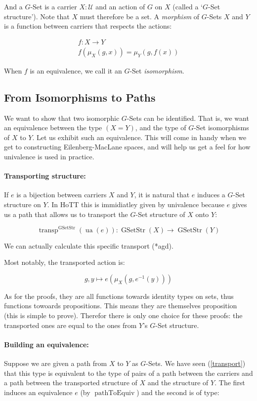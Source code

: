 \documentclass{article}
\DeclareMathOperator{\ua}{ua}
\DeclareMathOperator{\transp}{transp}
\DeclareMathOperator{\gsetstr}{GSetStr}
\DeclareMathOperator{\pathtoequiv}{pathToEquiv}
\begin{document}
And a $G$-Set is a carrier $X : \mathcal{U}$ and an action of $G$ on $X$ (called a `$G$-Set structure'). Note that $X$ must therefore be a set. A \emph{morphism} of $G$-Sets $X$ and $Y$ is a function between carriers that respects the actions:

\begin{gather*}
f : X \to Y \\
f(\mu_{X}(g,x)) = \mu_{Y}(g,f(x))
\end{gather*}

When $f$ is an equivalence, we call it an $G$-Set \emph{isomorphism}.

\subsection{From Isomorphisms to Paths} \label{iso}

We want to show that two isomorphic $G$-Sets can be identified. That is, we want an equivalence between the type $(X = Y)$, and the type of $G$-Set isomorphisms of $X$ to $Y$. Let us exhibit such an equivalence. This will come in handy when we get to constructing Eilenberg-MacLane spaces, and will help us get a feel for how univalence is used in practice.

\paragraph{Transporting structure:}

If $e$ is a bijection between carriers $X$ and $Y$, it is natural that $e$ induces a $G$-Set structure on $Y$. In HoTT this is immidiatley given by univalence because $e$ gives us a path that allows us to transport the $G$-Set structure of $X$ onto $Y$:

\[\transp^{\gsetstr}(\ua(e)) : \gsetstr(X) \to \gsetstr(Y)\]

We can actually calculate this specific transport (*agd).

Most notably, the transported action is:

\[g,y \mapsto e(\mu_{X}(g , e^{-1}(y)))\]

As for the proofs, they are all functions towards identity types on sets, thus functions towoards propositions. This means they are themselves proposition (this is simple to prove). Therefor there is only one choice for these proofs: the transported ones are equal to the ones from $Y$'s $G$-Set structure.

\paragraph{Building an equivalence:} Suppose we are given a path from $X$ to $Y$ as $G$-Sets. We have seen (\ref{transport}) that this type is equivalent to the type of pairs of a path between the carriers and a path between the transported structure of $X$ and the structure of $Y$. The first induces an equivalence $e$ (by $\pathtoequiv$) and the second is of type:
\end{document}
